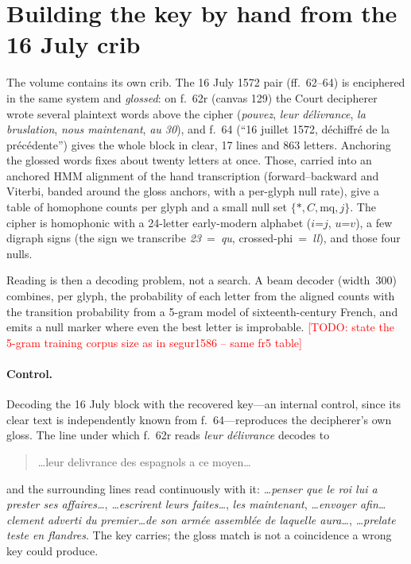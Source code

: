 \documentclass[11pt]{article}
\newcommand{\todo}[1]{\textcolor{red}{[TODO: #1]}}
\begin{document}
\section{Building the key by hand from the 16 July crib}

The volume contains its own crib. The 16 July 1572 pair (ff.~62--64) is enciphered in the same system and \emph{glossed}: on f.~62r (canvas 129) the Court decipherer wrote several plaintext words above the cipher (\emph{pouvez}, \emph{leur d\'elivrance}, \emph{la bruslation}, \emph{nous maintenant}, \emph{au 30}), and f.~64 (``16 juillet 1572, d\'echiffr\'e de la pr\'ec\'edente'') gives the whole block in clear, 17 lines and 863 letters. Anchoring the glossed words fixes about twenty letters at once. Those, carried into an anchored HMM alignment of the hand transcription (forward--backward and Viterbi, banded around the gloss anchors, with a per-glyph null rate), give a table of homophone counts per glyph and a small null set $\{*, C, \mathrm{mq}, j\}$. The cipher is homophonic with a 24-letter early-modern alphabet ($i$=$j$, $u$=$v$), a few digraph signs (the sign we transcribe \emph{23}~=~\emph{qu}, crossed-phi~=~\emph{ll}), and those four nulls.

Reading is then a decoding problem, not a search. A beam decoder (width~300) combines, per glyph, the probability of each letter from the aligned counts with the transition probability from a 5-gram model of sixteenth-century French, and emits a null marker where even the best letter is improbable. \todo{state the 5-gram training corpus size as in segur1586 -- same fr5 table}

\paragraph{Control.} Decoding the 16 July block with the recovered key---an internal control, since its clear text is independently known from f.~64---reproduces the decipherer's own gloss. The line under which f.~62r reads \emph{leur d\'elivrance} decodes to

\begin{quote}\small
\ldots leur delivrance des espagnols a ce moyen\ldots
\end{quote}

\noindent and the surrounding lines read continuously with it: \emph{\ldots penser que le roi lui a prester ses affaires\ldots}, \emph{\ldots escrirent leurs faites\ldots}, \emph{les maintenant}, \emph{\ldots envoyer afin\ldots clement adverti du premier\ldots de son arm\'ee assembl\'ee de laquelle aura\ldots}, \emph{\ldots prelate teste en flandres}. The key carries; the gloss match is not a coincidence a wrong key could produce.
\end{document}

